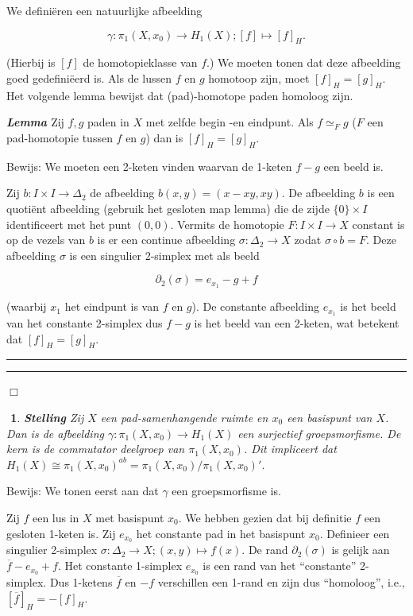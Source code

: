 \documentclass[12pt]{book}
\newcommand{\bew}{{\sc Bewijs: }}
\newcommand{\B}{\rule{1mm}{0mm} \hfill $\Box$ }
\newtheorem{stelh}{$\!\!$}[section]
\newenvironment{stel}{\begin{stelh}{\em {\bf Stelling }}}{\end{stelh}}
\newenvironment{lem}{\begin{lemh}{\em {\bf Lemma }}}{\end{lemh}}
\begin{document}
We defini\"eren een natuurlijke afbeelding

$$\gamma: \pi_{1}(X,x_0) \to H_{1}(X); [f] \mapsto [f]_H.$$


(Hierbij is $[f]$ de homotopieklasse van $f$.) We moeten tonen dat deze afbeelding goed gedefini\"eerd is. Als de lussen $f$ en $g$ homotoop zijn, moet $[f]_H=[g]_H$. Het volgende lemma bewijst  dat (pad)-homotope paden homoloog zijn.

\begin{lem} Zij $f,g$ paden in $X$ met zelfde begin -en eindpunt.  Als $f\simeq_{F} g$ ($F$ een pad-homotopie tussen
$f$ en $g$) dan is $[f]_{H}=[g]_H$.
\end{lem}
\bew We moeten een 2-keten vinden waarvan de 1-keten $f-g$ een beeld is.

Zij $b:I\times I\to \Delta_2$ de afbeelding $b(x,y)=(x-xy,xy)$. De afbeelding $b$ is een quoti\"ent afbeelding (gebruik het gesloten map lemma) die de zijde $\{0\} \times I$ identificeert met het punt $(0,0)$. 
Vermits de homotopie $F:I\times I \to X$ constant is op de vezels van $b$ is er een continue afbeelding $\sigma:\Delta_2\to X$ zodat $\sigma \circ b =F$. Deze afbeelding $\sigma$ is een singulier 2-simplex met als beeld

$$\partial_2(\sigma)=e_{x_{1}}-g+f$$

(waarbij $x_1$ het eindpunt is van $f$ en $g$). De constante afbeelding $e_{x_{1}}$ is het beeld van het constante 2-simplex dus $f-g$ is het beeld van een 2-keten, wat betekent dat $[f]_H=[g]_H$. \rule{1mm}{0mm} \hfill \B 

\begin{stel} Zij $X$ een pad-samenhangende ruimte en $x_0$ een basispunt van $X$. Dan is de afbeelding $\gamma:\pi_{1}(X,x_0)\to H_{1}(X)$ een surjectief groepsmorfisme. De kern is
de commutator deelgroep van $\pi_{1}(X,x_0)$. Dit impliceert dat $H_{1}(X)\cong \pi_{1}(X,x_0)^{ab} = 
\pi_{1}(X,x_0)/\pi_{1}(X,x_0)'$.\end{stel}

\bew 
We tonen eerst aan dat $\gamma$ een groepsmorfisme is. 

Zij $f$ een lus in $X$ met basispunt $x_0$. We hebben gezien dat bij definitie $f$  een gesloten 1-keten is. Zij $e_{x_{0}}$ het constante pad in het basispunt $x_0$. Definieer een singulier 2-simplex $\sigma: \Delta_2 \to X;
(x,y)\mapsto f(x)$. De rand $\partial_2(\sigma)$ is gelijk aan $\overline{f}-e_{x_{0}}+f$. Het constante 1-simplex $e_{x_{0}}$ is een rand van het ``constante'' 2-simplex. Dus 1-ketens $\overline{f}$ en $-f$ verschillen een 1-rand en zijn dus ``homoloog'', i.e., $[\overline{f}]_{H}=-[f]_{H}$.
\end{document}

